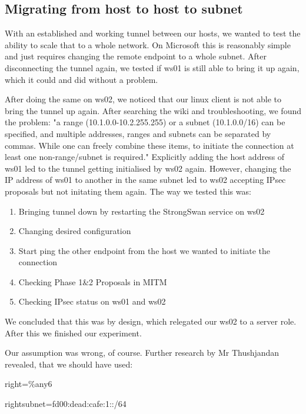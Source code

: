 \documentclass[a4paper]{report}
\begin{document}
\subsection{Migrating from host to host to subnet}
\label{ssec:MigHost}
With an established and working tunnel between our hosts, we wanted to test the ability to scale that to a whole network. On Microsoft this is reasonably simple and just requires changing the remote endpoint to a whole subnet. After disconnecting the tunnel again, we tested if ws01 is still able to bring it up again, which it could and did without a problem.

After doing the same on ws02, we noticed that our linux client is not able to bring the tunnel up again. After searching the wiki and troubleshooting, we found the problem: "a range (10.1.0.0-10.2.255.255) or a subnet (10.1.0.0/16) can be specified, and multiple addresses, ranges and subnets can be separated by commas. While one can freely combine these items, to initiate the connection at least one non-range/subnet is required." \parencite{Lang2017StrongSwan}
Explicitly adding the host address of ws01 led to the tunnel getting initialised by ws02 again. However, changing the IP address of ws01 to another in the same subnet led to ws02 accepting IPsec proposals but not initating them again. The way we tested this was:

\begin{enumerate}
	\item Bringing tunnel down by restarting the StrongSwan service on ws02
	\item Changing desired configuration
	\item Start ping the other endpoint from the host we wanted to initiate the connection
	\item Checking Phase 1\&2 Proposals in MITM
	\item Checking IPsec status on ws01 and ws02
\end{enumerate}

We concluded that this was by design, which relegated our ws02 to a server role. After this we finished our experiment.

Our assumption was wrong, of course. Further research by Mr Thushjandan revealed, that we should have used:

\begin{codebox}
	right=\%any6
	
	\noindent rightsubnet=fd00:dead:cafe:1::/64
\end{codebox}
\end{document}
